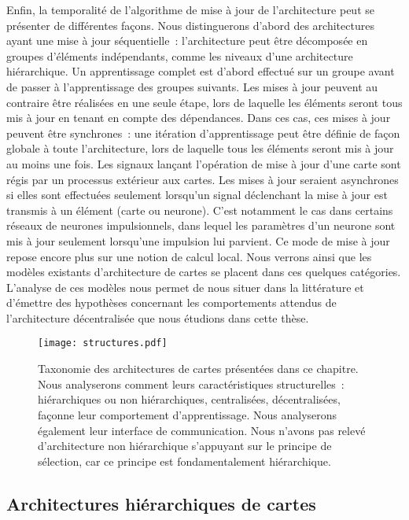 \documentclass[../main]{subfiles}
\begin{document}
Enfin, la temporalité de l'algorithme de mise à jour de l'architecture peut se présenter de différentes façons. Nous distinguerons d'abord des architectures ayant une mise à jour séquentielle~: l'architecture peut être décomposée en groupes d'éléments indépendants, comme les niveaux d'une architecture hiérarchique. 
Un apprentissage complet est d'abord effectué sur un groupe avant de passer à l'apprentissage des groupes suivants. 
Les mises à jour peuvent au contraire être réalisées en une seule étape, lors de laquelle les éléments seront tous mis à jour en tenant en compte des dépendances. Dans ces cas, ces mises à jour peuvent être synchrones~: une itération d'apprentissage peut être définie de façon globale à toute l'architecture, lors de laquelle tous les éléments seront mis à jour au moins une fois. Les signaux lançant l'opération de mise à jour d'une carte sont régis par un processus extérieur aux cartes.
Les mises à jour seraient asynchrones si elles sont effectuées seulement lorsqu'un signal déclenchant la mise à jour est transmis à un élément (carte ou neurone). C'est notamment le cas dans certains réseaux de neurones impulsionnels, dans lequel les paramètres d'un neurone sont mis à jour seulement lorsqu'une impulsion lui parvient. Ce mode de mise à jour repose encore plus sur une notion de calcul local.
Nous verrons ainsi que les modèles existants d'architecture de cartes se placent dans ces quelques catégories. 
L'analyse de ces modèles nous permet de nous situer dans la littérature et d'émettre des hypothèses concernant les comportements attendus de l'architecture décentralisée que nous étudions dans cette thèse. 

\begin{figure}
\centering\texttt{[image: structures.pdf]}
\caption{Taxonomie des architectures de cartes présentées dans ce chapitre. Nous analyserons comment leurs caractéristiques structurelles~: hiérarchiques ou non hiérarchiques, centralisées, décentralisées, façonne leur comportement d'apprentissage. Nous analyserons également leur interface de communication. Nous n'avons pas relevé d'architecture non hiérarchique s'appuyant sur le principe de sélection, car ce principe est fondamentalement hiérarchique. \label{fig:taxo}}
\end{figure}



\subsection{Architectures hiérarchiques de cartes}
\end{document}
